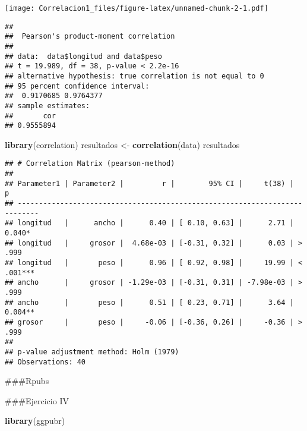 \documentclass[
]{article}
\newenvironment{Shaded}{\begin{snugshade}}{\end{snugshade}}
\newcommand{\FunctionTok}[1]{\textcolor[rgb]{0.13,0.29,0.53}{\textbf{#1}}}
\newcommand{\NormalTok}[1]{#1}
\newcommand{\OtherTok}[1]{\textcolor[rgb]{0.56,0.35,0.01}{#1}}
\newcommand{\SpecialCharTok}[1]{\textcolor[rgb]{0.81,0.36,0.00}{\textbf{#1}}}
\begin{document}
\texttt{[image: Correlacion1\_files/figure-latex/unnamed-chunk-2-1.pdf]}

\begin{Shaded}
\end{Shaded}

\begin{verbatim}
## 
##  Pearson's product-moment correlation
## 
## data:  data$longitud and data$peso
## t = 19.989, df = 38, p-value < 2.2e-16
## alternative hypothesis: true correlation is not equal to 0
## 95 percent confidence interval:
##  0.9170685 0.9764377
## sample estimates:
##       cor 
## 0.9555894
\end{verbatim}

\begin{Shaded}
\begin{Highlighting}[]
\FunctionTok{library}\NormalTok{(correlation)}
\NormalTok{resultados }\OtherTok{\textless{}{-}} \FunctionTok{correlation}\NormalTok{(data)}
\NormalTok{resultados}
\end{Highlighting}
\end{Shaded}

\begin{verbatim}
## # Correlation Matrix (pearson-method)
## 
## Parameter1 | Parameter2 |         r |        95% CI |     t(38) |         p
## ---------------------------------------------------------------------------
## longitud   |      ancho |      0.40 | [ 0.10, 0.63] |      2.71 | 0.040*   
## longitud   |     grosor |  4.68e-03 | [-0.31, 0.32] |      0.03 | > .999   
## longitud   |       peso |      0.96 | [ 0.92, 0.98] |     19.99 | < .001***
## ancho      |     grosor | -1.29e-03 | [-0.31, 0.31] | -7.98e-03 | > .999   
## ancho      |       peso |      0.51 | [ 0.23, 0.71] |      3.64 | 0.004**  
## grosor     |       peso |     -0.06 | [-0.36, 0.26] |     -0.36 | > .999   
## 
## p-value adjustment method: Holm (1979)
## Observations: 40
\end{verbatim}

\#\#\#Rpubs

\#\#\#Ejercicio IV

\begin{Shaded}
\begin{Highlighting}[]
\FunctionTok{library}\NormalTok{(ggpubr)}
\end{Highlighting}
\end{Shaded}
\end{document}
